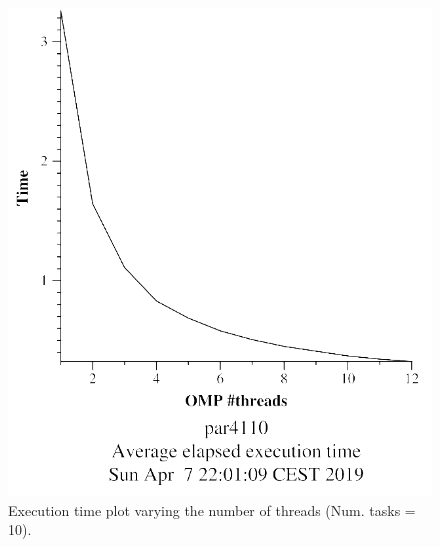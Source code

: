 \documentclass[12pt, a4paper]{article}
\begin{document}
\begin{figure}[H]
\centering
\begin{minipage}[b]{0.4\linewidth}
  \centering
  \includegraphics[scale=0.5]{./mandel-omp-10000-strong-omp-24-10-time}
  \caption{Execution time plot varying the number of threads (Num. tasks = 10).}
  \label{fig:mandel-omp-10000-strong-omp-24-10-time}
\end{minipage}%
\hspace{0.5cm}
\begin{minipage}[b]{0.4\linewidth}
  \centering

\end{minipage}
\end{figure}
\end{document}
